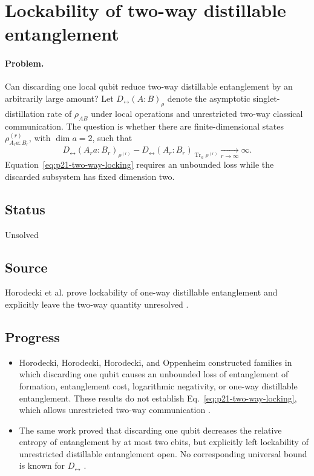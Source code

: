 \section{Lockability of two-way distillable entanglement}
\label{sec:problem-21}

\paragraph{Problem.}
Can discarding one local qubit reduce two-way distillable entanglement by an
arbitrarily large amount?  Let $D_{\leftrightarrow}(A:B)_\rho$ denote the
asymptotic singlet-distillation rate of $\rho_{AB}$ under local operations and
unrestricted two-way classical communication.  The question is whether there
are finite-dimensional states $\rho^{(r)}_{A_ra:B_r}$, with $\dim a=2$, such
that
\begin{equation}
  D_{\leftrightarrow}(A_ra:B_r)_{\rho^{(r)}}
  -D_{\leftrightarrow}(A_r:B_r)_{\operatorname{Tr}_a\rho^{(r)}}
  \xrightarrow[r\to\infty]{}\infty.
  \label{eq:p21-two-way-locking}
\end{equation}
Equation~\eqref{eq:p21-two-way-locking} requires an unbounded loss while the
discarded subsystem has fixed dimension two.

\subsection*{Status}

Unsolved

\subsection*{Source}

Horodecki et al. prove lockability of one-way distillable entanglement and
explicitly leave the two-way quantity unresolved
.

\subsection*{Progress}

\begin{itemize}
  \item Horodecki, Horodecki, Horodecki, and Oppenheim constructed families
  in which discarding one qubit causes an unbounded loss of entanglement of
  formation, entanglement cost, logarithmic negativity, or one-way
  distillable entanglement.  These results do not establish
  Eq.~\eqref{eq:p21-two-way-locking}, which allows unrestricted two-way
  communication .

  \item The same work proved that discarding one qubit decreases the relative
  entropy of entanglement by at most two ebits, but explicitly left
  lockability of unrestricted distillable entanglement open.  No corresponding
  universal bound is known for $D_{\leftrightarrow}$
  .
\end{itemize}

